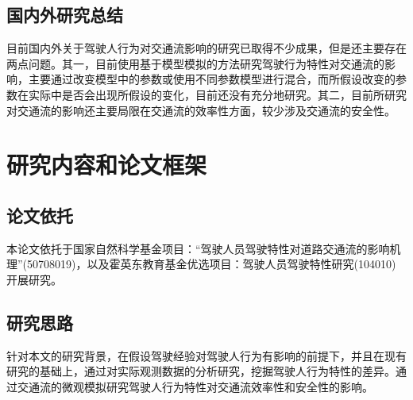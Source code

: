 \subsection{国内外研究总结}

目前国内外关于驾驶人行为对交通流影响的研究已取得不少成果，但是还主要存在两点问题。其一，目前使用基于模型模拟的方法研究驾驶行为特性对交通流的影响，主要通过改变模型中的参数或使用不同参数模型进行混合，而所假设改变的参数在实际中是否会出现所假设的变化，目前还没有充分地研究。其二，目前所研究对交通流的影响还主要局限在交通流的效率性方面，较少涉及交通流的安全性。


%
%

\section{研究内容和论文框架}

\subsection{论文依托}

本论文依托于国家自然科学基金项目：“驾驶人员驾驶特性对道路交通流的影响机理”(50708019)，以及霍英东教育基金优选项目：驾驶人员驾驶特性研究(104010)开展研究。


\subsection{研究思路}
针对本文的研究背景，在假设驾驶经验对驾驶人行为有影响的前提下，并且在现有研究的基础上，通过对实际观测数据的分析研究，挖掘驾驶人行为特性的差异。通过交通流的微观模拟研究驾驶人行为特性对交通流效率性和安全性的影响。


